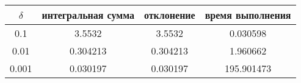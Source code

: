 \begin{tabular}{|c|c|c|c|}
    \hline
    $\delta$ & интегральная сумма & отклонение & время выполнения\\
    \hline
    0.1 & 3.5532 & 3.5532 & 0.030598\\
    \hline
    0.01 & 0.304213 & 0.304213 & 1.960662\\
    \hline
    0.001 & 0.030197 & 0.030197 & 195.901473\\
    \hline
\end{tabular}
